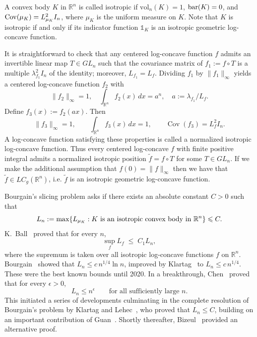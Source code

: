\documentclass[11pt,leqno]{article}
\theoremstyle{definition}
\theoremstyle{remark}
\numberwithin{equation}{section}
\newcommand{\vol}{\mathrm{vol}}
\newcommand{\ls}{\leqslant}
\begin{document}
A convex body $K$ in $\mathbb{R}^n$ is called isotropic if $\vol_n(K)=1$, ${\rm bar}(K)=0$, and
${\rm Cov}(\mu_K)=L_{\mu_K}^2I_n$, where $\mu_K$ is the uniform measure on $K$. Note that $K$ is isotropic 
if and only if its indicator function $\mathds{1}_K$ is an isotropic geometric log-concave function.

\smallskip

It is straightforward to check that any centered log-concave function $f$ admits an invertible linear map  
$T\in GL_n$ such that the covariance matrix of $f_1 := f\circ T$ is a multiple $\lambda_{f_1}^2 I_n$ of the identity; moreover, $L_{f_1}=L_f$.  
Dividing $f_1$ by $\|f_1\|_{\infty}$ yields a centered log-concave function $f_2$ with
$$\|f_2\|_{\infty}=1,\quad \int_{\mathbb{R}^n} f_2(x)\,dx = a^n,\quad a := \lambda_{f_1}/L_f.$$
Define $f_3(x) := f_2(a x)$. Then
$$\|f_3\|_{\infty}=1, \qquad \int_{\mathbb{R}^n} f_3(x)\, dx = 1, \qquad\operatorname{Cov}(f_3) = L_f^2 I_n.$$
A log-concave function satisfying these properties is called a normalized isotropic log-concave function.  
Thus every centered log-concave $f$ with finite positive integral admits a normalized isotropic position  
$\tilde f = f\circ T$ for some $T\in GL_n$. If we make the additional assumption that $f(0)=\|f\|_{\infty}$ then
we have that $\tilde{f}\in LC_g(\mathbb{R}^n)$, i.e. $\tilde{f}$ is an isotropic geometric log-concave function.


\smallskip

Bourgain's slicing problem \cite{Bourgain-1986} asks if there exists an absolute constant $C>0$ such that
\begin{equation}\label{eq:conjecture}L_n:=\max\{ L_{\mu_K}:K\ \hbox{is an isotropic convex body in}\ \mathbb{R}^n\}\ls C.\end{equation}
K.~Ball~\cite{Ball-1988} proved that for every $n$,
$$\sup_f L_f \;\ls \; C_1L_n,$$
where the supremum is taken over all isotropic log-concave functions $f$ on $\mathbb{R}^n$.
Bourgain~\cite{Bourgain-1991} showed that $L_n \ls c\, n^{1/4}\ln n$, improved by Klartag~\cite{Klartag-2006} to $L_n \ls c\, n^{1/4}$.  
These were the best known bounds until 2020. In a breakthrough, Chen~\cite{C} proved that for every $\epsilon>0$,
$$L_n \ls n^{\epsilon}\qquad \text{for all sufficiently large $n$}.$$
This initiated a series of developments culminating in the complete resolution of Bourgain's problem by Klartag and 
Lehec~\cite{KL}, who proved that $L_n\ls C$, building on an important contribution of Guan~\cite{Guan}. 
Shortly thereafter, Bizeul~\cite{Bizeul-2025} provided an alternative proof.
\end{document}
